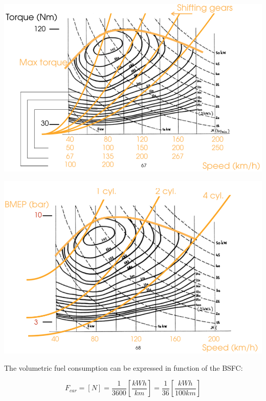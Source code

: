 	\begin{center}
			\begin{minipage}{0.4\textwidth}			
			\includegraphics[scale=0.3]{ch2/19}
			\label{fig:2.19}
			\end{minipage}
			\begin{minipage}{0.4\textwidth}			
			\includegraphics[scale=0.3]{ch2/20}
			\label{fig:2.20}
			\end{minipage}
			\end{center}
			
	The volumetric fuel consumption can be expressed in function of the BSFC: 
	
	\begin{equation}
	F_{car} = [N] = \frac{1}{3600} \left[ \frac{kW h}{km} \right] = \frac{1}{36} \left[ \frac{kW h}{100 km} \right]
	\end{equation}
	
